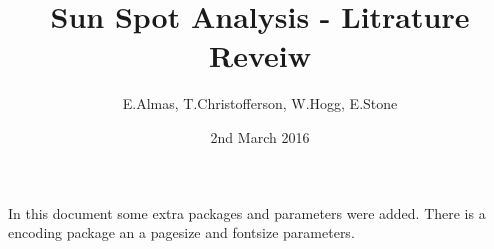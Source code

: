 \documentclass[12pt, letterpaper, twoside]{article}
\title{Sun Spot Analysis - Litrature Reveiw}
\author{E.Almas, T.Christofferson, W.Hogg, E.Stone }
\date{2nd March 2016}
\begin{document}
 
\begin{titlepage}
\maketitle
\end{titlepage}
 
In this document some extra packages and parameters
were added. There is a encoding package
\cite{blah}
an a pagesize and fontsize parameters.

\printbibliography
 
\end{document}

